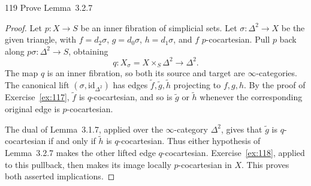 \begin{exercise}{119}
Prove Lemma~3.2.7

\begin{proof}
Let $p\colon X\to S$ be an inner fibration of simplicial sets.
Let $\sigma\colon\Delta^2\to X$ be the given triangle, with
$f=d_2\sigma$, $g=d_0\sigma$, $h=d_1\sigma$, and $f$ $p$-cocartesian.
Pull $p$ back along $p\sigma\colon\Delta^2\to S$, obtaining
\[
 q\colon X_\sigma=X\times_S\Delta^2\longrightarrow\Delta^2.
\]
The map $q$ is an inner fibration, so both its source and target are
$\infty$-categories.
The canonical lift $(\sigma,\mathrm{id}_{\Delta^2})$ has edges
$\widetilde f,\widetilde g,\widetilde h$ projecting to $f,g,h$.
By the proof of Exercise~\ref{ex:117}, $\widetilde f$ is $q$-cocartesian,
and so is $\widetilde g$ or $\widetilde h$ whenever the corresponding
original edge is $p$-cocartesian.

The dual of Lemma~3.1.7, applied over the $\infty$-category $\Delta^2$,
gives that $\widetilde g$ is $q$-cocartesian if and only if
$\widetilde h$ is $q$-cocartesian.
Thus either hypothesis of Lemma~3.2.7 makes the other lifted edge
$q$-cocartesian.
Exercise~\ref{ex:118}, applied to this pullback, then makes its image
locally $p$-cocartesian in $X$.
This proves both asserted implications.
\end{proof}
\end{exercise}
